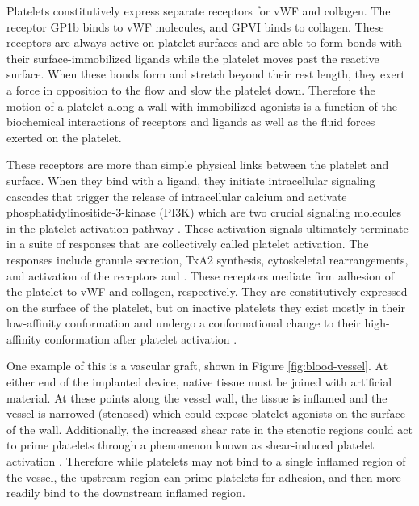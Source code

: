 \documentclass{biophys-new}
\begin{document}
Platelets constitutively express separate receptors for vWF and
collagen. The receptor GP1b binds to vWF molecules, and GPVI binds to
collagen. These receptors are always active on platelet surfaces and
are able to form bonds with their surface-immobilized ligands while
the platelet moves past the reactive surface. When these bonds form
and stretch beyond their rest length, they exert a force in opposition
to the flow and slow the platelet down. Therefore the motion of a
platelet along a wall with immobilized agonists is a function of the
biochemical interactions of receptors and ligands as well as the fluid
forces exerted on the platelet.
		
These receptors are more than simple physical links between the
platelet and surface. When they bind with a ligand, they initiate
intracellular signaling cascades that trigger the release of
intracellular calcium and activate phosphatidylinositide-3-kinase
(PI3K) which are two crucial signaling molecules in the platelet
activation pathway \cite{Bye2016,Du2007,Senis2014}. These activation
signals ultimately terminate in a suite of responses that are
collectively called platelet activation. The responses include granule
secretion, TxA2 synthesis, cytoskeletal rearrangements, and activation
of the receptors  and . These receptors
mediate firm adhesion of the platelet to vWF and collagen,
respectively. They are constitutively expressed on the surface of the
platelet, but on inactive platelets they exist mostly in their
low-affinity conformation and undergo a conformational change to their
high-affinity conformation after platelet activation
\cite{Qiu2015,Shattil1998,Shattil2010}.


%   

One example of this is a vascular graft, shown in Figure
\ref{fig:blood-vessel}. At either end of the implanted device, native
tissue must be joined with artificial material. At these points along
the vessel wall, the tissue is inflamed and the vessel is narrowed
(stenosed) which could expose platelet agonists on the surface of the
wall. Additionally, the increased shear rate in the stenotic regions
could act to prime platelets through a phenomenon known as
shear-induced platelet activation
\cite{Fogelson2015,Kroll96,Shankaran2003}. Therefore while platelets
may not bind to a single inflamed region of the vessel, the upstream
region can prime platelets for adhesion, and then more readily bind to
the downstream inflamed region.
\end{document}
